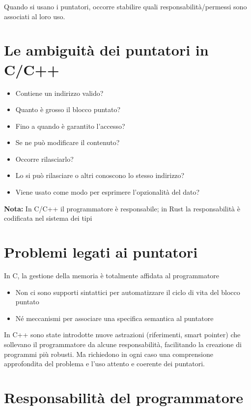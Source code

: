 Quando si usano i puntatori, occorre stabilire quali responsabilità/permessi sono associati al loro uso.

\section{Le ambiguità dei puntatori in C/C++}

\begin{itemize}
  \item Contiene un indirizzo valido?
  \item Quanto è grosso il blocco puntato?
  \item Fino a quando è garantito l'accesso?
  \item Se ne può modificare il contenuto?
  \item Occorre rilasciarlo?
  \item Lo si può rilasciare o altri conoscono lo stesso indirizzo?
  \item Viene usato come modo per esprimere l'opzionalità del dato?
\end{itemize}



\noindent
\begin{tcolorbox}
  \textbf{Nota:} In C/C++ il programmatore è responsabile; in Rust la responsabilità è codificata nel sistema dei tipi
\end{tcolorbox}

\section{Problemi legati ai puntatori  }

In C, la gestione della memoria è totalmente affidata al programmatore

\begin{itemize}
  \item Non ci sono supporti sintattici per automatizzare il ciclo di vita del blocco puntato
  \item Né meccanismi per associare una specifica semantica al puntatore
\end{itemize}

In C++ sono state introdotte nuove astrazioni (riferimenti, smart pointer) che sollevano il programmatore da alcune responsabilità, facilitando la creazione di programmi più robusti. Ma richiedono in ogni caso una comprensione approfondita del problema e l'uso attento e coerente dei puntatori.

\section{Responsabilità del programmatore  }

